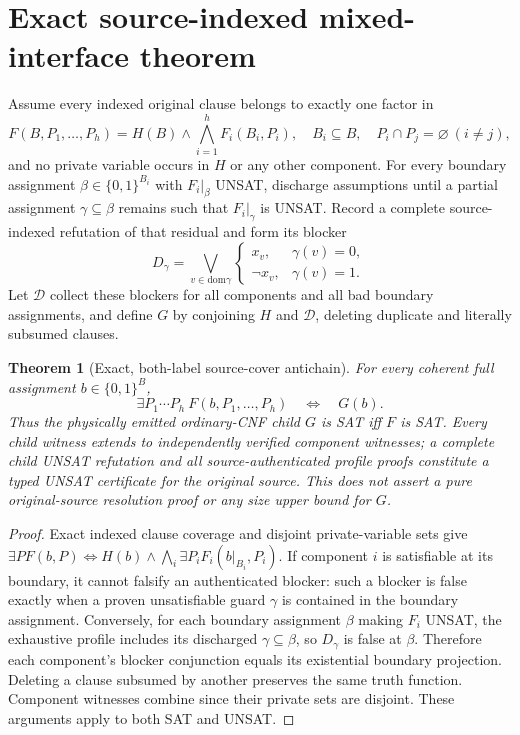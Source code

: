 \documentclass[11pt]{article}
\newtheorem{theorem}{Theorem}
\begin{document}
\section{Exact source-indexed mixed-interface theorem}
Assume every indexed original clause belongs to exactly one factor in
\[
F(B,P_1,\ldots,P_h)=H(B)\wedge\bigwedge_{i=1}^h F_i(B_i,P_i),
\quad B_i\subseteq B,\quad P_i\cap P_j=\varnothing\ (i\ne j),
\]
and no private variable occurs in $H$ or any other component. For every boundary assignment $\beta\in\{0,1\}^{B_i}$ with $F_i|_\beta$ UNSAT, discharge assumptions until a partial assignment $\gamma\subseteq\beta$ remains such that $F_i|_\gamma$ is UNSAT. Record a complete source-indexed refutation of that residual and form its blocker
\[
D_\gamma=\bigvee_{v\in\mathrm{dom}\gamma}
\begin{cases}x_v,&\gamma(v)=0,\\\neg x_v,&\gamma(v)=1.\end{cases}
\]
Let $\mathcal D$ collect these blockers for all components and all bad boundary assignments, and define $G$ by conjoining $H$ and $\mathcal D$, deleting duplicate and literally subsumed clauses.

\begin{theorem}[Exact, both-label source-cover antichain]
For every coherent full assignment $b\in\{0,1\}^{B}$,
\[
\exists P_1\cdots P_h\ F(b,P_1,\ldots,P_h)\quad\Longleftrightarrow\quad G(b).
\]
Thus the physically emitted ordinary-CNF child $G$ is SAT iff $F$ is SAT. Every child witness extends to independently verified component witnesses; a complete child UNSAT refutation and all source-authenticated profile proofs constitute a typed UNSAT certificate for the original source. This does not assert a pure original-source resolution proof or any size upper bound for $G$.
\end{theorem}
\begin{proof}
Exact indexed clause coverage and disjoint private-variable sets give
$\exists P F(b,P)\iff H(b)\wedge\bigwedge_i\exists P_i F_i(b|_{B_i},P_i)$.
If component $i$ is satisfiable at its boundary, it cannot falsify an authenticated blocker: such a blocker is false exactly when a proven unsatisfiable guard $\gamma$ is contained in the boundary assignment. Conversely, for each boundary assignment $\beta$ making $F_i$ UNSAT, the exhaustive profile includes its discharged $\gamma\subseteq\beta$, so $D_\gamma$ is false at $\beta$. Therefore each component's blocker conjunction equals its existential boundary projection. Deleting a clause subsumed by another preserves the same truth function. Component witnesses combine since their private sets are disjoint. These arguments apply to both SAT and UNSAT.\end{proof}
\end{document}
